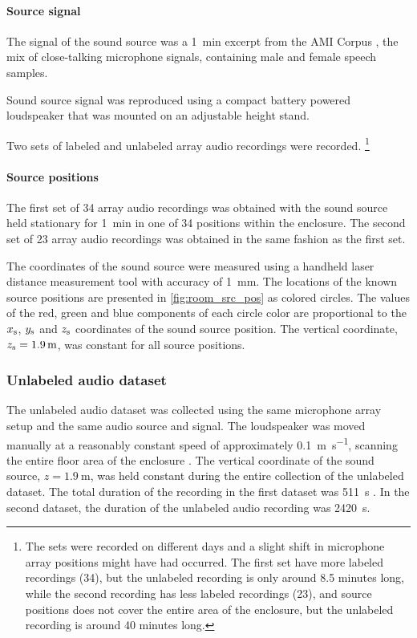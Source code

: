 \documentclass[applsci,article,submit,moreauthors,pdftex]{Definitions/mdpi}
\begin{document}
\paragraph{Source signal}
The signal of the sound source was a \SI{1}{\minute} excerpt from the AMI Corpus \cite{carlettaAMIMeetingCorpus2006}, the mix of close-talking microphone signals, containing male and female speech samples.

Sound source signal was reproduced using a compact battery powered loudspeaker that was mounted on an adjustable height stand.

Two sets of labeled and unlabeled array audio recordings were recorded. \footnote{The sets were recorded on different days and a slight shift in microphone array positions might have had occurred. The first set have more labeled recordings (34), but the unlabeled recording is only around 8.5 minutes long, while the second recording has less labeled recordings (23), and source positions does not cover the entire area of the enclosure, but the unlabeled recording is around 40 minutes long.}

\paragraph{Source positions}

The first set of 34 array audio recordings was obtained with the sound source held stationary for \SI{1}{\minute} in one of 34 positions within the enclosure. 
The second set of 23 array audio recordings was obtained in the same fashion as the first set.

The coordinates of the sound source were measured using a handheld laser distance measurement tool with accuracy of \SI{1}{\mm}. The locations of the known source positions are presented in \figurename{} \ref{fig:room_src_pos} as colored circles. The values of the red, green and blue components of each circle color are proportional to the $ x_{\mathrm{s}} $, $ y_{\mathrm{s}} $ and $ z_{\mathrm{s}} $ coordinates of the sound source position.
The vertical coordinate, $ z_{\src} = \SI{1.9}{\m} $, was constant for all source positions.

\subsubsection{Unlabeled audio dataset}
The unlabeled audio dataset was collected using the same microphone array setup and the same audio source and signal. The loudspeaker was moved manually at a reasonably constant speed of approximately \SI{0.1}{\m\per\s}, scanning the entire floor area of the enclosure . The vertical coordinate of the sound source, $ z = \SI{1.9}{\m} $, was held constant during the entire collection of the unlabeled dataset. 
The total duration of the recording in the first dataset was \SI{511}{\s} . In the second dataset, the duration of the unlabeled audio recording was \SI{2420}{\second}.
\end{document}
